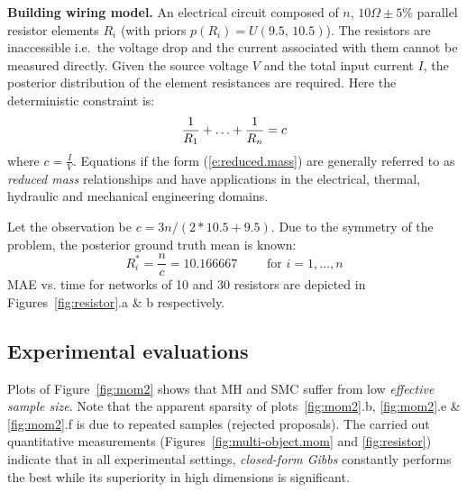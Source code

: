 \documentclass[letterpaper]{article}
\newcommand{\pr}{p}
\begin{document}
\noindent
{\bf Building wiring model. } 
An electrical circuit composed of $n$, $10\Omega\pm5\%$ parallel resistor elements $R_i$
(with priors $\pr(R_i) = U(9.5, \, 10.5)$).
The resistors are inaccessible i.e.\ the voltage drop and the current associated with them cannot be measured directly.
Given the source voltage $V$ and the total input current $I$, the posterior distribution of the element resistances are required.
Here the deterministic constraint is:
\begin{equation} \footnotesize 
\label{e:reduced.mass}
 \frac{1}{R_1} + \ldots + \frac{1}{R_n} = c
\end{equation}
where $c = \frac{I}{V}$.
Equations if the form (\ref{e:reduced.mass}) are generally referred to as \emph{reduced mass} relationships and 
have applications in the electrical, thermal, hydraulic and mechanical engineering domains.

Let the observation be $c = {3n}/{(2*10.5 + 9.5)}$.
Due to the symmetry of the problem, the posterior ground truth mean is known:
\begin{equation*}
R_i^* = \frac{n}{c} = 10.166667\qquad \text{ for } i = 1, \ldots, n
\end{equation*}
MAE vs. time for networks of 10 and 30 resistors are depicted in 
Figures~\ref{fig:resistor}.a \& b respectively.

\subsection{Experimental evaluations}
Plots of Figure~\ref{fig:mom2} shows that MH and SMC suffer from low \emph{effective sample size}. 
Note that the apparent sparsity of plots~\ref{fig:mom2}.b, \ref{fig:mom2}.e \& \ref{fig:mom2}.f is due to repeated samples (rejected proposals).
%
The carried out quantitative measurements 
(Figures~\ref{fig:multi-object.mom} and \ref{fig:resistor}) 
indicate that in all experimental settings,
\emph{closed-form Gibbs} constantly performs the best while its superiority in high dimensions is significant.
\end{document}

